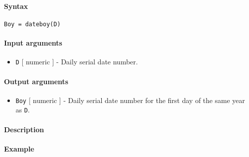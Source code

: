 


	\paragraph{Syntax}\label{syntax}

\begin{verbatim}
Boy = dateboy(D)
\end{verbatim}

\paragraph{Input arguments}\label{input-arguments}

\begin{itemize}
\itemsep1pt\parskip0pt
\item
  \texttt{D} {[} numeric {]} - Daily serial date number.
\end{itemize}

\paragraph{Output arguments}\label{output-arguments}

\begin{itemize}
\itemsep1pt\parskip0pt
\item
  \texttt{Boy} {[} numeric {]} - Daily serial date number for the first
  day of the same year as \texttt{D}.
\end{itemize}

\paragraph{Description}\label{description}

\paragraph{Example}\label{example}


